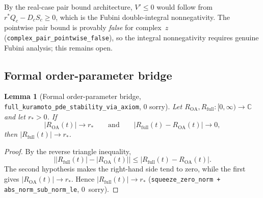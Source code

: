 \documentclass[11pt,a4paper]{article}
\newtheorem{lemma}[theorem]{Lemma}
\theoremstyle{definition}
\newcommand{\C}{\mathbb{C}}
\begin{document}
By the real-case pair bound architecture, $V' \leq 0$ would follow from $r^*Q_c - D_cS_c \geq 0$, which is the Fubini double-integral nonnegativity. The pointwise pair bound is provably \emph{false} for complex~$z$ (\texttt{complex\_pair\_pointwise\_false}), so the integral nonnegativity requires genuine Fubini analysis; this remains open.

\subsection{Formal order-parameter bridge}\label{sec:bridge}

\begin{lemma}[Formal order-parameter bridge, \texttt{full\_kuramoto\_pde\_stability\_via\_axiom}, 0 sorry]\label{lem:bridge}
Let $R_{\mathrm{OA}}, R_{\mathrm{full}} : [0,\infty) \to \C$ and let $r_* > 0$. If
\[
|R_{\mathrm{OA}}(t)| \to r_*
\qquad\text{and}\qquad
|R_{\mathrm{full}}(t) - R_{\mathrm{OA}}(t)| \to 0,
\]
then $|R_{\mathrm{full}}(t)| \to r_*$.
\end{lemma}
\begin{proof}
By the reverse triangle inequality,
\[
\bigl||R_{\mathrm{full}}(t)| - |R_{\mathrm{OA}}(t)|\bigr| \leq |R_{\mathrm{full}}(t) - R_{\mathrm{OA}}(t)|.
\]
The second hypothesis makes the right-hand side tend to zero, while the first gives $|R_{\mathrm{OA}}(t)| \to r_*$. Hence $|R_{\mathrm{full}}(t)| \to r_*$ (\texttt{squeeze\_zero\_norm + abs\_norm\_sub\_norm\_le}, 0~sorry).
\end{proof}
\end{document}
